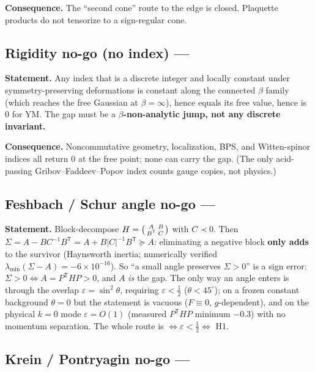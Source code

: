 \textbf{Consequence.} The ``second cone'' route to the edge is closed. Plaquette products do not
tensorize to a sign-regular cone.

\subsection{Rigidity no-go (no index) --- \LN}

\textbf{Statement.} Any index that is a discrete integer and locally constant under
symmetry-preserving deformations is constant along the connected $\beta$ family (which reaches
the free Gaussian at $\beta=\infty$), hence equals its free value, hence is $0$ for YM. The gap
must be a \textbf{$\beta$-non-analytic jump, not any discrete invariant.}

\textbf{Consequence.} Noncommutative geometry, localization, BPS, and Witten-spinor indices all
return $0$ at the free point; none can carry the gap. (The only acid-passing
Gribov--Faddeev--Popov index counts gauge copies, not physics.)

\subsection{Feshbach / Schur angle no-go --- \LN}

\textbf{Statement.} Block-decompose $H=\begin{psmallmatrix}A&B\\B^{\mathsf T}&C\end{psmallmatrix}$
with $C\prec0$. Then $\Sigma=A-BC^{-1}B^{\mathsf T}=A+B|C|^{-1}B^{\mathsf T}\succeq A$:
eliminating a negative block \textbf{only adds} to the survivor (Haynsworth inertia; numerically
verified $\lambda_{\min}(\Sigma-A)=-6\times10^{-16}$). So ``a small angle preserves $\Sigma>0$''
is a sign error: $\Sigma>0\iff A=P^{\mathsf T}HP>0$, and $A$ \emph{is} the gap. The only way an
angle enters is through the overlap $\varepsilon=\sin^2\theta$, requiring $\varepsilon<\tfrac12$
($\theta<45^\circ$); on a frozen constant background $\theta=0$ but the statement is vacuous
($F\equiv0$, $g$-dependent), and on the physical $k=0$ mode $\varepsilon=O(1)$ (measured
$P^{\mathsf T}HP$ minimum $-0.3$) with no momentum separation. The whole route is
$\iff\varepsilon<\tfrac12\iff$ H1.

\subsection{Krein / Pontryagin no-go --- \LN}

